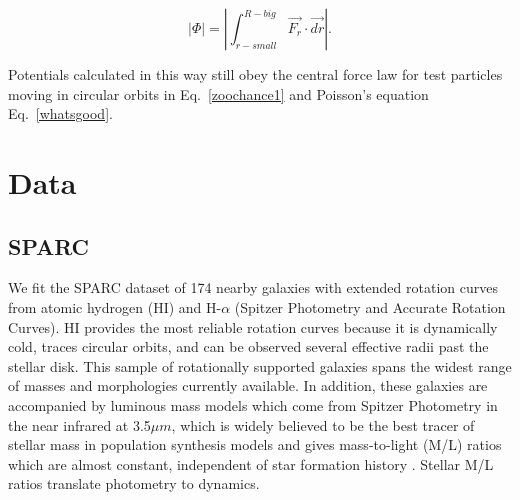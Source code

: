 \documentclass[reprint,%
 amsmath,amssymb,
 aps,
]{revtex4-1}
\begin{document}
 \begin{equation}
    | \Phi | = \left|  \int^{R-big}_{r-small} \vec{F_r}\cdot\vec{dr}\right|.
      \label{eq:Newt2}
      \end{equation}
 
 

   
 Potentials calculated in this way still obey the central force law for test particles moving in circular orbits in Eq.~\ref{zoochance1} and Poisson's equation Eq.~\ref{whatsgood}.
   
 

 
    
% 
\section{Data \label{sec:data}}
 
 \subsection{SPARC }
 We fit the SPARC dataset  of  174 nearby galaxies with extended rotation curves from atomic hydrogen (HI)  and H-$\alpha$ (Spitzer Photometry and Accurate Rotation Curves)\cite{2016Lelli}. HI provides the most reliable
 rotation curves because it is dynamically cold, traces circular orbits, and can be observed several effective radii past the stellar disk. This sample of rotationally supported galaxies   spans the widest range of masses and morphologies currently available. In addition, these galaxies are  accompanied by luminous mass models which come from   Spitzer Photometry in the 
   near infrared  at 3.5$\mu m$, which is widely believed to be the best tracer of stellar mass   in population synthesis models and   gives mass-to-light (M/L) ratios which are almost constant, independent of star formation history \cite{BelldYong,10.1093/mnras/sty3223}.  Stellar M/L ratios   translate   photometry to dynamics. 
   
\end{document}
